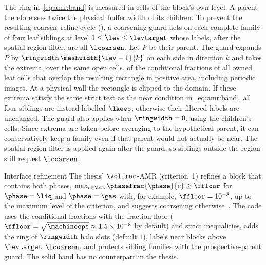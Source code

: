 The ring in~\cref{eq:amr:band} is measured in cells of the block's own
level. A parent therefore sees twice the physical buffer width of its
children. To prevent the resulting coarsen--refine cycle (), a
coarsening guard acts on each complete family of four leaf siblings at level
$1\le\lev\le\levtarget$ whose labels, after the spatial-region filter, are
all $\lcoarsen$.
Let $P$ be their parent. The guard expands $P$ by
$\ringwidth\,\meshwidth{\lev-1}{k}$ on each side in direction $k$ and takes
the extrema, over the same open cells, of the conditional fractions of all
owned leaf cells that overlap the resulting rectangle in positive area,
including periodic images.
At a physical wall the rectangle is clipped to the domain. If these extrema
satisfy the same strict test as the near condition in~\cref{eq:amr:band},
all four siblings are instead labelled $\lkeep$; otherwise their filtered
labels are unchanged. The guard also applies when $\ringwidth=0$, using the
children's cells. Since extrema are taken before averaging to the hypothetical
parent, it can conservatively keep a family even if that parent would not
actually be near. The spatial-region filter is applied again after the guard,
so siblings outside the region still request $\lcoarsen$.

\begin{deviation}{Interface refinement}\label{dev:amr:band}
The thesis' $\volfrac$-AMR (criterion~1) refines a block that contains both
phases, $\max_{c\in\blk}\phasefrac{\phase}{c}\ge\ffloor$ for $\phase=\liq$
and $\phase=\gas$ with, for example, $\ffloor=10^{-8}$, up to the maximum
level of the criterion, and suggests coarsening otherwise~. The
code uses the conditional fractions with the fraction floor
($\ffloor=\sqrt{\machineeps}\approx1.5\times10^{-8}$ by default) and strict
inequalities, adds the ring of $\ringwidth$ halo slots (default $1$), labels
near blocks above $\levtarget$ $\lcoarsen$, and protects sibling families with
the prospective-parent guard. The solid band has no counterpart in the thesis.
\end{deviation}

